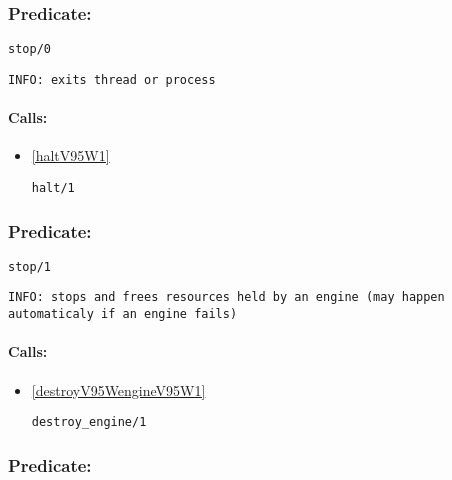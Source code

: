 \subsubsection{Predicate:} \label{stopV95W0}

\begin{verbatim}
stop/0
\end{verbatim}

{\small \begin{verbatim}
INFO: exits thread or process

\end{verbatim}}
\paragraph{Calls:} 
\begin{itemize}
\item \ref{haltV95W1} 
\begin{verbatim}
halt/1
\end{verbatim}

\end{itemize}

\subsubsection{Predicate:} \label{stopV95W1}

\begin{verbatim}
stop/1
\end{verbatim}

{\small \begin{verbatim}
INFO: stops and frees resources held by an engine (may happen automaticaly if an engine fails)

\end{verbatim}}
\paragraph{Calls:} 
\begin{itemize}
\item \ref{destroyV95WengineV95W1} 
\begin{verbatim}
destroy_engine/1
\end{verbatim}

\end{itemize}

\subsubsection{Predicate:} \label{stopV95WrpcV95W0}

